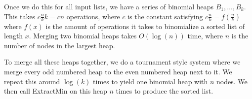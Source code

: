 \documentclass[letterpaper,10pt]{article}
\begin{document}
\begin{enumerate}
\begin{enumerate}[a)]
		Once we do this for all input lists, we have a series of binomial heaps $B_1,\dots,B_k$. This takes $c \frac{n}{k}k = cn$ operations, where $c$ is the constant satisfying $c\frac{n}{k} = f(\frac{n}{k})$ where $f(x)$ is the amount of operations it takes to binomialize a sorted list of length $x$. Merging two binomial heaps takes $O(\log(n))$ time, where $n$ is the number of nodes in the largest heap.

		To merge all these heaps together, we do a tournament style system where we merge every odd numbered heap to the even numbered heap next to it. We repeat this around $\log(k)$ times to yield one binomial heap with $n$ nodes. We then call ExtractMin on this heap $n$ times to produce the sorted list.
	\end{enumerate}
	

\end{enumerate}
\end{document}
